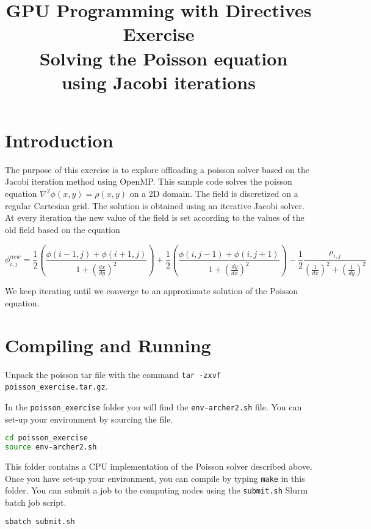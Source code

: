 \documentclass{article}
\title{GPU Programming with Directives Exercise \\\ Solving the Poisson equation using Jacobi iterations}
\author{}
\date{}
\begin{document}
\maketitle

\section{Introduction}

The purpose of this exercise is to explore offloading a poisson solver based on the Jacobi iteration method using OpenMP. 
This sample code solves the poisson equation $\nabla^2 \phi(x,y) = \rho(x,y)$ on a 2D domain. 
The field is discretized on a regular Cartesian grid.
The solution is obtained using an iterative Jacobi solver. At every iteration the new value of the field is set according to the values of the old field based on the equation

\begin{equation}
    \phi^{new}_{i,j}= \frac{1}{2} \left( \frac{\phi( i-1,j) + \phi(i+1,j)}{1+\left(\frac{dx}{dy}\right)^2}\right)  + \frac{1}{2} \left( \frac{\phi( i ,j-1) + \phi(i,j+1)}{1+\left(\frac{dy}{dx}\right)^2}\right) -  \frac{1}{2}\frac{\rho_{i,j}}{\left(\frac{1}{dx}\right)^2 + \left(\frac{1}{dy}\right)^2 }
\end{equation}

We keep iterating until we converge to an approximate solution of the Poisson equation.

\section{Compiling and Running}
Unpack the poisson tar file with the command \texttt{tar -zxvf poisson\_exercise.tar.gz}.

In the \texttt{poisson\_exercise} folder you will find the \texttt{env-archer2.sh} file. You can set-up your environment by sourcing the file.

\begin{lstlisting}[language=Bash]
cd poisson_exercise
source env-archer2.sh
\end{lstlisting}

This folder contains a CPU implementation of the Poisson solver described above. 
Once you have set-up your environment, you can compile by typing \texttt{make} in this folder.
You can submit a job to the computing nodes using the \texttt{submit.sh} Slurm batch job script.

\begin{lstlisting}[language=Bash]
sbatch submit.sh
\end{lstlisting}
\end{document}
